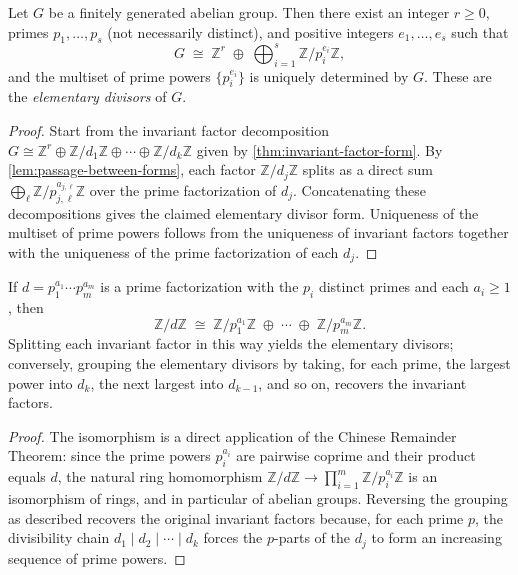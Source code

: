 \begin{theorem}
    \label{thm:elementary-divisor-form}
    Let $G$ be a finitely generated abelian group. Then there exist an integer $r \ge 0$,
    primes $p_1, \dots, p_s$ (not necessarily distinct), and positive integers
    $e_1, \dots, e_s$ such that
    \[
        G \;\cong\; \mathbb{Z}^r \;\oplus\; \bigoplus_{i=1}^{s} \mathbb{Z}/p_i^{e_i}\mathbb{Z},
    \]
    and the multiset of prime powers $\{p_i^{e_i}\}$ is uniquely determined by $G$. These are
    the \emph{elementary divisors} of $G$.
\end{theorem}
\begin{proof}
    Start from the invariant factor decomposition
    $G \cong \mathbb{Z}^r \oplus \mathbb{Z}/d_1\mathbb{Z} \oplus \cdots
    \oplus \mathbb{Z}/d_k\mathbb{Z}$ given by \cref{thm:invariant-factor-form}. By
    \cref{lem:passage-between-forms}, each factor $\mathbb{Z}/d_j\mathbb{Z}$ splits as a
    direct sum $\bigoplus_\ell \mathbb{Z}/p_{j,\ell}^{a_{j,\ell}}\mathbb{Z}$ over the prime
    factorization of $d_j$. Concatenating these decompositions gives the claimed elementary
    divisor form. Uniqueness of the multiset of prime powers follows from the uniqueness of
    invariant factors together with the uniqueness of the prime factorization of each $d_j$.
\end{proof}

\begin{lemma}
    \label{lem:passage-between-forms}
    If $d = p_1^{a_1} \cdots p_m^{a_m}$ is a prime factorization with the $p_i$ distinct
    primes and each $a_i \ge 1$, then
    \[
        \mathbb{Z}/d\mathbb{Z} \;\cong\; \mathbb{Z}/p_1^{a_1}\mathbb{Z} \;\oplus\; \cdots
        \;\oplus\; \mathbb{Z}/p_m^{a_m}\mathbb{Z}.
    \]
    Splitting each invariant factor in this way yields the elementary divisors; conversely,
    grouping the elementary divisors by taking, for each prime, the largest power into $d_k$,
    the next largest into $d_{k-1}$, and so on, recovers the invariant factors.
\end{lemma}
\begin{proof}
    The isomorphism is a direct application of the Chinese Remainder Theorem: since the
    prime powers $p_i^{a_i}$ are pairwise coprime and their product equals $d$, the natural
    ring homomorphism
    $\mathbb{Z}/d\mathbb{Z} \to \prod_{i=1}^m \mathbb{Z}/p_i^{a_i}\mathbb{Z}$
    is an isomorphism of rings, and in particular of abelian groups. Reversing the grouping
    as described recovers the original invariant factors because, for each prime $p$, the
    divisibility chain $d_1 \mid d_2 \mid \cdots \mid d_k$ forces the $p$-parts of the $d_j$
    to form an increasing sequence of prime powers.
\end{proof}


